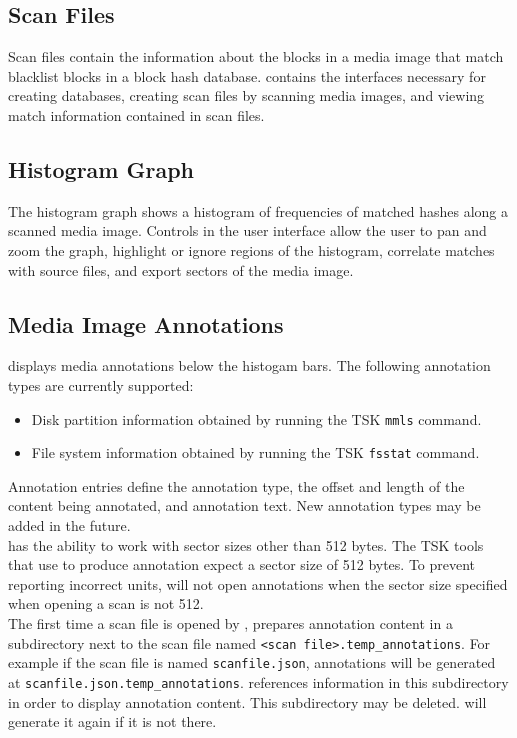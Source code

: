 \documentclass[11pt,fleqn]{article} %
\begin{document}
\subsection{Scan Files}
Scan files contain the information about the blocks in a media image that match 
blacklist blocks in a block hash database. \sscope contains the interfaces necessary for creating \hdb databases, creating scan files by scanning media images, and viewing match information contained in scan files.

\subsection{Histogram Graph}
The histogram graph shows a histogram of frequencies of matched hashes along a scanned media image. Controls in the user interface allow the user to pan and zoom the graph, highlight or ignore regions of the histogram, correlate matches with source files, and export sectors of the media image.

\subsection{Media Image Annotations}
\label{annotations}
\sscope displays media annotations below the histogam bars. The following annotation types are currently supported:
\begin{itemize}
\item Disk partition information obtained by running the TSK \verb+mmls+ command.
\item File system information obtained by running the TSK \verb+fsstat+ command.
\end{itemize}

Annotation entries define the annotation type, the offset and length of the content being annotated, and annotation text. New annotation types may be added in the future.\\

\sscope has the ability to work with sector sizes other than 512 bytes. The TSK tools that \sscope use to produce annotation expect a sector size of 512 bytes. To prevent reporting incorrect units, \sscope will not open annotations when the sector size specified when opening a scan is not 512.\\

The first time a scan file is opened by \sscope, \sscope prepares annotation content in a subdirectory next to the scan file named \verb+<scan file>.temp_annotations+. For example if the scan file is named \verb+scanfile.json+, annotations will be generated at \verb+scanfile.json.temp_annotations+. \sscope references information in this subdirectory in order to display annotation content. This subdirectory may be deleted. \sscope will generate it again if it is not there.
\end{document}

